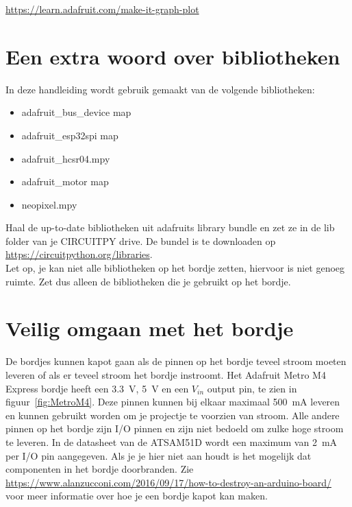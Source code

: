 \url{https://learn.adafruit.com/make-it-graph-plot}

\newpage
\section{Een extra woord over bibliotheken}\label{sec:library}
In deze handleiding wordt gebruik gemaakt van de volgende bibliotheken:
\begin{itemize}
	\item adafruit\_bus\_device map
	\item adafruit\_esp32spi map
	\item adafruit\_hcsr04.mpy
	\item adafruit\_motor map
	\item neopixel.mpy
\end{itemize}

Haal de up-to-date bibliotheken uit adafruits library bundle en zet ze in de lib folder van je CIRCUITPY drive. De bundel is te downloaden op \\

\url{https://circuitpython.org/libraries}. \\

Let op, je kan niet alle bibliotheken op het bordje zetten, hiervoor is niet genoeg ruimte. Zet dus alleen de bibliotheken die je gebruikt op het bordje.


\section{Veilig omgaan met het bordje}\label{sec:VeiligOmgaan}
De bordjes kunnen kapot gaan als de pinnen op het bordje teveel stroom moeten leveren of als er teveel stroom het bordje instroomt. Het Adafruit Metro M4 Express bordje heeft een \SI{3.3}{\volt}, \SI{5}{\volt} en een $V_{in}$ output pin, te zien in figuur~\ref{fig:MetroM4}. Deze pinnen kunnen bij elkaar maximaal \SI{500}{\milli\ampere} leveren en kunnen gebruikt worden om je projectje te voorzien van stroom. Alle andere pinnen op het bordje zijn I/O pinnen en zijn niet bedoeld om zulke hoge stroom te leveren. In de datasheet van de ATSAM51D wordt een maximum van \SI{2}{\milli\ampere} per I/O pin aangegeven. Als je je hier niet aan houdt is het mogelijk dat componenten in het bordje doorbranden. Zie \url{https://www.alanzucconi.com/2016/09/17/how-to-destroy-an-arduino-board/} voor meer informatie over hoe je een bordje kapot kan maken.

